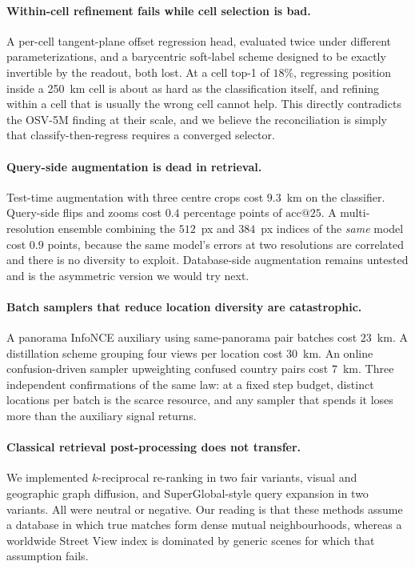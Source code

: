 \documentclass[11pt,a4paper]{article}
\begin{document}
\paragraph{Within-cell refinement fails while cell selection is bad.} A per-cell
tangent-plane offset regression head, evaluated twice under different parameterizations, and
a barycentric soft-label scheme designed to be exactly invertible by the readout, both lost.
At a cell top-1 of $18\%$, regressing position inside a 250~km cell is about as hard as the
classification itself, and refining within a cell that is usually the wrong cell cannot help.
This directly contradicts the OSV-5M \cite{astruc2024osv5m} finding at their scale, and we
believe the reconciliation is simply that classify-then-regress requires a converged selector.

\paragraph{Query-side augmentation is dead in retrieval.} Test-time augmentation with three
centre crops cost $9.3$~km on the classifier. Query-side flips and zooms cost $0.4$
percentage points of $\mathrm{acc@}25$. A multi-resolution ensemble combining the $512$~px and
$384$~px indices of the \emph{same} model cost $0.9$ points, because the same model's errors
at two resolutions are correlated and there is no diversity to exploit. Database-side
augmentation remains untested and is the asymmetric version we would try next.

\paragraph{Batch samplers that reduce location diversity are catastrophic.} A panorama InfoNCE
auxiliary using same-panorama pair batches cost $23$~km. A distillation scheme grouping four
views per location cost $30$~km. An online confusion-driven sampler upweighting confused
country pairs cost $7$~km. Three independent confirmations of the same law: at a fixed step
budget, distinct locations per batch is the scarce resource, and any sampler that spends it
loses more than the auxiliary signal returns.

\paragraph{Classical retrieval post-processing does not transfer.} We implemented
$k$-reciprocal re-ranking \cite{zhong2017reranking} in two fair variants, visual and
geographic graph diffusion, and SuperGlobal-style query expansion \cite{shao2023superglobal}
in two variants. All were neutral or negative. Our reading is that these methods assume a
database in which true matches form dense mutual neighbourhoods, whereas a worldwide Street
View index is dominated by generic scenes for which that assumption fails.
\end{document}
